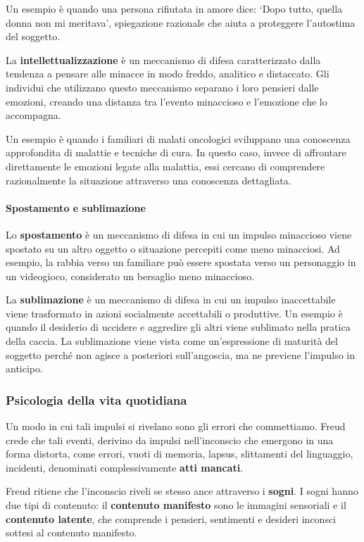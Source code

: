 \documentclass{subfiles}
\begin{document}
Un esempio è quando una persona rifiutata in amore dice: `Dopo tutto, quella donna non mi meritava', 
spiegazione razionale che aiuta a proteggere l'autostima del soggetto.

La \textbf{intellettualizzazione} è un meccanismo di difesa caratterizzato dalla tendenza a 
pensare alle minacce in modo freddo, analitico e distaccato. Gli individui che utilizzano questo 
meccanismo separano i loro pensieri dalle emozioni, creando una distanza tra l'evento minaccioso 
e l'emozione che lo accompagna.

Un esempio è quando i familiari di malati oncologici sviluppano una conoscenza approfondita 
di malattie e tecniche di cura. In questo caso, invece di affrontare direttamente le emozioni 
legate alla malattia, essi cercano di comprendere razionalmente la situazione attraverso una 
conoscenza dettagliata.\\

\paragraph{Spostamento e sublimazione}
Lo \textbf{spostamento} è un meccanismo di difesa in cui un impulso minaccioso viene spostato 
su un altro oggetto o situazione percepiti come meno minacciosi. Ad esempio, la rabbia verso 
un familiare può essere spostata verso un personaggio in un videogioco, considerato un bersaglio 
meno minaccioso. 

La \textbf{sublimazione} è un meccanismo di difesa in cui un impulso inaccettabile viene 
trasformato in azioni socialmente accettabili o produttive. Un esempio è quando il desiderio 
di uccidere e aggredire gli altri viene sublimato nella pratica della caccia. La sublimazione 
viene vista come un'espressione di maturità del soggetto perché non agisce a posteriori 
sull'angoscia, ma ne previene l'impulso in anticipo.\\

\subsubsection{Psicologia della vita quotidiana}
Un modo in cui tali impulsi si rivelano sono gli errori che commettiamo. 
Freud crede che tali eventi, derivino da impulsi nell'inconscio che emergono in una forma 
distorta, come errori, vuoti di memoria, lapsus, slittamenti del linguaggio, incidenti, denominati 
complessivamente \textbf{atti mancati}.

Freud ritiene che l'inconscio riveli se stesso ance attraverso i \textbf{sogni}. 
I sogni hanno due tipi di contenuto: il \textbf{contenuto manifesto} sono le immagini sensoriali 
e il \textbf{contenuto latente}, che comprende i pensieri, sentimenti e desideri inconsci sottesi 
al contenuto manifesto.
\end{document}
